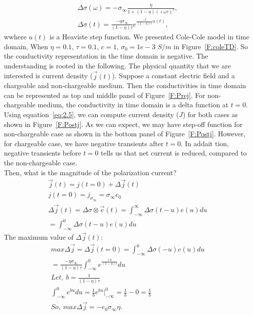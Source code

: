 \documentclass[a4paper, 11pt]{article}
\renewcommand {\j}  { {\vec j} }
\newcommand {\e}  { {\vec e} }
\begin{document}
\begin{align}
	\Delta \sigma(\omega) = -\sigma_{\infty}\frac{\eta}{1+(1-\eta)(\imath\omega\tau)^c}, \label{eq:2.9}\\
	\Delta \sigma(t) = \frac{-\eta\sigma_{\infty}}{(1-\eta)\tau}e^{\frac{-t}{(1-\eta)\tau}u(t)}, \label{eq:2.10}
\end{align}
wwhere $u(t)$ is a Heaviste step function. We presented Cole-Cole model in time domain, When $\eta=0.1$, $\tau=0.1$, $c=1$, $\sigma_0=1e-3$ $S/m$ in Figure~\ref{F:coleTD}. So the conductivity representation in the time domain is negative. The understanding is rooted in the following. The physical quantity that we are interested is current density ($\j(t)$). Suppose a constant electric field and a chargeable and non-chargeable medium. Then the conductivities in time domain can be represented as top and middle panel of Figure~\ref{F:Prej}. For non-chargeable medium, the conductivity in time domain is a delta function at $t=0$. Using equation~\ref{eq:2.5}, we can compute current density ($J$) for both cases as shown in Figure~\ref{F:Postj}. As we can expect, we may have step-off function for non-chargeable case as shown in the bottom panel of Figure~\ref{F:Postj}. However, for chargeable case, we have negative transients after $t=0$. In addait tion, negative transients before $t=0$ tells us that net current is reduced, compared to the non-chargeable case. \\
Then, what is the magnitude of the polarization current?
\begin{eqnarray}
	\j(t) = j(t=0) + \Delta \j(t) \\
	j(t=0) = j_{\sigma_{\infty}} =\sigma_{\infty}e_0 \\
	\Delta \j(t) = \Delta \sigma \otimes \e(t) = \int^{\infty}_{-\infty} \Delta \sigma(t-u) e(u) du \\
											 = \int^{0}_{-\infty} \Delta \sigma(t-u) e(u) du
\end{eqnarray}
The maximum value of $\Delta \j(t)$:
\begin{eqnarray}
	max\Delta \j = \Delta \j(t=0) = \int^{0}_{-\infty} \Delta \sigma(-u) e(u) du\\
	= \frac{-\eta\sigma_{\infty}}{(1-\eta)\tau}\int_{-\infty}^{0} e^{\frac{+u}{(1-\eta)\tau}} du\\
	Let,\ b = \frac{1}{(1-\eta)\tau}\nonumber \\ 
	\int_{-\infty}^{0} e^{bu} du = \frac{1}{b}e^{bu}|^{0}_{-\infty} = \frac{1}{b}-0 = \frac{1}{b}\nonumber \\
	So,\ max\Delta \j = - e_0\sigma_{\infty}\eta.	
\end{eqnarray}
\end{document}
